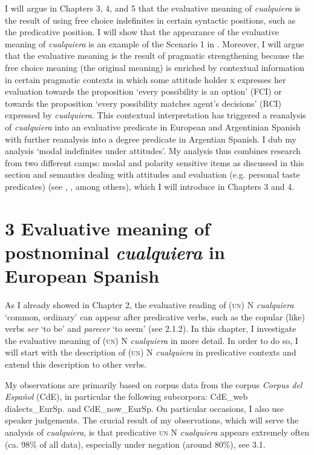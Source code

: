   I will argue in Chapters 3, 4, and 5 that the evaluative meaning of \textit{cualquiera} is the result of using free choice indefinites in certain syntactic positions, such as the predicative position. I will show that the appearance of the evaluative meaning of \textit{cualquiera} is an example of the Scenario 1 in . Moreover, I will argue that the evaluative meaning is the result of pragmatic strengthening because the free choice meaning (the original meaning) is enriched by contextual information in certain pragmatic contexts in which some attitude holder x expresses her evaluation towards the proposition ‘every possibility is an option’ (FCI) or towards the proposition ‘every possibility matches agent’s decisions’ (RCI) expressed by \textit{cualquiera}. This contextual interpretation has triggered a reanalysis of \textit{cualquiera} into an evaluative predicate in European and Argentinian Spanish with further reanalysis into a degree predicate in Argentian Spanish. I dub my analysis ‘modal indefinites under attitudes’. My analysis thus combines research from two different camps: modal and polarity sensitive items as discussed in this section and semantics dealing with attitudes and evaluation (e.g. personal taste predicates) (see \citealt{Heim1992}, \citealt{Lasersohn2005}, among others), which I will introduce in Chapters 3 and 4.

\chapter{\textbf{3} \textbf{Evaluative} \textbf{meaning} \textbf{of} \textbf{postnominal} \textbf{\textit{cualquiera} }\textbf{in} \textbf{European} \textbf{Spanish}}

As I already showed in Chapter 2, the evaluative reading of (\textsc{un)} N \textit{cualquiera} ‘common, ordinary’ can appear after predicative verbs, such as the copular (like) verbs \textit{ser} ‘to be’ and \textit{parecer} ‘to seem’ (see 2.1.2). In this chapter, I investigate the evaluative meaning of (\textsc{un)} N \textit{cualquiera} in more detail. In order to do so, I will start with the description of (\textsc{un)} N \textit{cualquiera} in predicative contexts and extend this description to other verbs.

  My observations are primarily based on corpus data from the corpus \textit{Corpus del Español} (CdE), in particular the following subcorpora: CdE\_web dialects\_EurSp. and CdE\_now\_EurSp. On particular occasions, I also use speaker judgements. The crucial result of my observations, which will serve the analysis of \textit{cualquiera}, is that predicative \textsc{un} N \textit{cualquiera} appears extremely often (ca. 98\% of all data), especially under negation (around 80\%), see 3.1.

